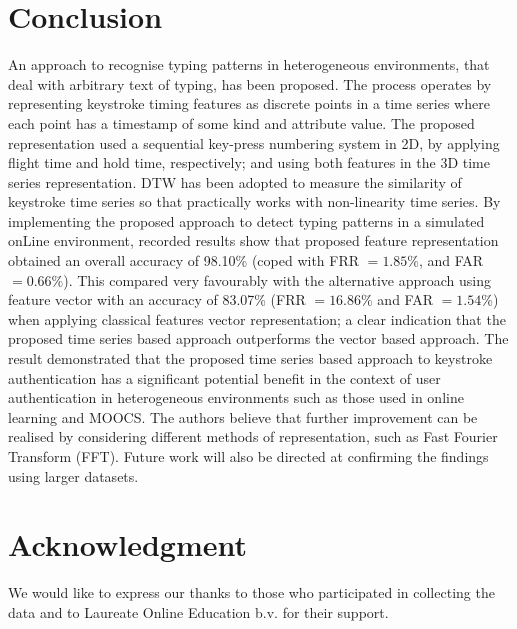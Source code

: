 \documentclass[runningheads,a4paper]{llncs}
\begin{document}
\section{Conclusion} \label{sec:conclusion}
An approach to recognise typing patterns in heterogeneous environments, that deal with arbitrary text of typing, has been proposed. The process operates by representing keystroke timing features as discrete points in a time series where each point has a timestamp of some kind and attribute value. The proposed representation used a sequential key-press numbering system in 2D, by applying flight time and hold time, respectively; and using both features in the 3D time series representation. DTW has been adopted to measure the similarity of keystroke time series so that practically works with non-linearity time series. By implementing the proposed approach to detect typing patterns in a simulated onLine environment, recorded results show that proposed feature representation obtained an overall accuracy of 98.10\% (coped with FRR $=1.85\%$, and FAR $=0.66\%$). This compared very favourably with the alternative approach using feature vector with an accuracy of 83.07\% (FRR $=16.86\%$ and FAR $=1.54\%$) when applying classical features vector representation; a clear indication that the proposed time series based approach outperforms the vector based approach. The result demonstrated that the proposed time series based approach to keystroke authentication has a significant potential benefit in the context of user authentication in heterogeneous environments such as those used in online learning and MOOCS. The authors believe that further improvement can be realised by considering different methods of representation, such as Fast Fourier Transform (FFT). Future work will also be directed at confirming the findings using larger datasets.


\section*{Acknowledgment}
We would like to express our thanks to those who participated in collecting the data and to Laureate Online Education b.v. for their support.




\end{document}
